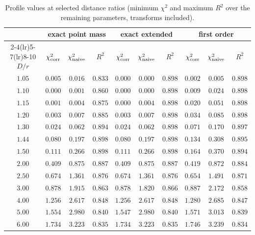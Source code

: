 \documentclass[10pt]{article}
\begin{document}
\begin{table}[!htb]\centering\small
\caption{Profile values at selected distance ratios (minimum $\chi^2$ and maximum $R^2$ over the remaining parameters, transforms included).}\label{tab:profile}
\begin{tabular}{c ccc ccc ccc}\toprule
 & \multicolumn{3}{c}{exact point mass} & \multicolumn{3}{c}{exact extended} & \multicolumn{3}{c}{first order}\\\cmidrule(lr){2-4}\cmidrule(lr){5-7}\cmidrule(lr){8-10}
$D/r$ & $\chi^2_{\rm corr}$ & $\chi^2_{\rm naive}$ & $R^2$ & $\chi^2_{\rm corr}$ & $\chi^2_{\rm naive}$ & $R^2$ & $\chi^2_{\rm corr}$ & $\chi^2_{\rm naive}$ & $R^2$\\\midrule

$1.05$ & $0.005$ & $0.016$ & $0.833$ & $0.000$ & $0.000$ & $0.898$ & $0.002$ & $0.005$ & $0.898$\\
$1.10$ & $0.000$ & $0.001$ & $0.860$ & $0.000$ & $0.000$ & $0.898$ & $0.009$ & $0.024$ & $0.898$\\
$1.15$ & $0.001$ & $0.004$ & $0.875$ & $0.000$ & $0.004$ & $0.898$ & $0.020$ & $0.051$ & $0.898$\\
$1.20$ & $0.003$ & $0.007$ & $0.885$ & $0.003$ & $0.007$ & $0.898$ & $0.034$ & $0.085$ & $0.898$\\
$1.30$ & $0.024$ & $0.062$ & $0.894$ & $0.024$ & $0.062$ & $0.898$ & $0.071$ & $0.170$ & $0.897$\\
$1.44$ & $0.080$ & $0.197$ & $0.898$ & $0.080$ & $0.197$ & $0.898$ & $0.134$ & $0.308$ & $0.895$\\
$1.50$ & $0.111$ & $0.266$ & $0.898$ & $0.111$ & $0.266$ & $0.898$ & $0.164$ & $0.370$ & $0.894$\\
$2.00$ & $0.409$ & $0.875$ & $0.887$ & $0.409$ & $0.875$ & $0.887$ & $0.419$ & $0.872$ & $0.884$\\
$2.50$ & $0.674$ & $1.361$ & $0.876$ & $0.674$ & $1.361$ & $0.876$ & $0.654$ & $1.491$ & $0.871$\\
$3.00$ & $0.878$ & $1.915$ & $0.863$ & $0.878$ & $1.820$ & $0.866$ & $0.887$ & $2.172$ & $0.858$\\
$4.00$ & $1.256$ & $2.617$ & $0.848$ & $1.256$ & $2.617$ & $0.848$ & $1.280$ & $2.685$ & $0.847$\\
$5.00$ & $1.554$ & $2.980$ & $0.840$ & $1.547$ & $2.980$ & $0.840$ & $1.571$ & $3.013$ & $0.839$\\
$6.00$ & $1.734$ & $3.223$ & $0.835$ & $1.734$ & $3.223$ & $0.835$ & $1.746$ & $3.239$ & $0.834$\\
\bottomrule
\end{tabular}
\end{table}
\end{document}
